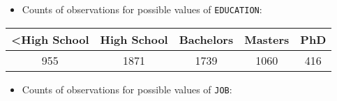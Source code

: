 \documentclass[]{article}
\providecommand{\tightlist}{%
  \setlength{\itemsep}{0pt}\setlength{\parskip}{0pt}}
\begin{document}
\begin{itemize}
\tightlist
\item
  Counts of observations for possible values of \texttt{EDUCATION}:
\end{itemize}

\begin{longtable}[]{@{}ccccc@{}}
\toprule
\begin{minipage}[b]{0.18\columnwidth}\centering\strut
\textless{}High School\strut
\end{minipage} & \begin{minipage}[b]{0.17\columnwidth}\centering\strut
High School\strut
\end{minipage} & \begin{minipage}[b]{0.14\columnwidth}\centering\strut
Bachelors\strut
\end{minipage} & \begin{minipage}[b]{0.12\columnwidth}\centering\strut
Masters\strut
\end{minipage} & \begin{minipage}[b]{0.06\columnwidth}\centering\strut
PhD\strut
\end{minipage}\tabularnewline
\midrule
\endhead
\begin{minipage}[t]{0.18\columnwidth}\centering\strut
955\strut
\end{minipage} & \begin{minipage}[t]{0.17\columnwidth}\centering\strut
1871\strut
\end{minipage} & \begin{minipage}[t]{0.14\columnwidth}\centering\strut
1739\strut
\end{minipage} & \begin{minipage}[t]{0.12\columnwidth}\centering\strut
1060\strut
\end{minipage} & \begin{minipage}[t]{0.06\columnwidth}\centering\strut
416\strut
\end{minipage}\tabularnewline
\bottomrule
\end{longtable}

\begin{itemize}
\tightlist
\item
  Counts of observations for possible values of \texttt{JOB}:
\end{itemize}
\end{document}
